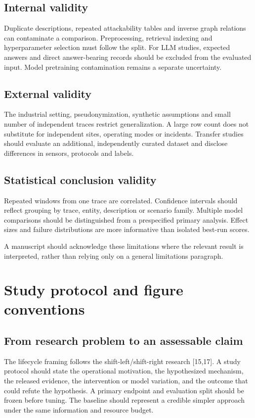 \subsection*{Internal validity}
Duplicate descriptions, repeated attackability tables and inverse graph relations can contaminate a comparison. Preprocessing, retrieval indexing and hyperparameter selection must follow the split. For LLM studies, expected answers and direct answer-bearing records should be excluded from the evaluated input. Model pretraining contamination remains a separate uncertainty.

\subsection*{External validity}
The industrial setting, pseudonymization, synthetic assumptions and small number of independent traces restrict generalization. A large row count does not substitute for independent sites, operating modes or incidents. Transfer studies should evaluate an additional, independently curated dataset and disclose differences in sensors, protocols and labels.

\subsection*{Statistical conclusion validity}
Repeated windows from one trace are correlated. Confidence intervals should reflect grouping by trace, entity, description or scenario family. Multiple model comparisons should be distinguished from a prespecified primary analysis. Effect sizes and failure distributions are more informative than isolated best-run scores.

A manuscript should acknowledge these limitations where the relevant result is interpreted, rather than relying only on a general limitations paragraph.

\clearpage\section{Study protocol and figure conventions}
\subsection*{From research problem to an assessable claim}
The lifecycle framing follows the shift-left/shift-right research [15,17]. A study protocol should state the operational motivation, the hypothesized mechanism, the released evidence, the intervention or model variation, and the outcome that could refute the hypothesis. A primary endpoint and evaluation split should be frozen before tuning. The baseline should represent a credible simpler approach under the same information and resource budget.

